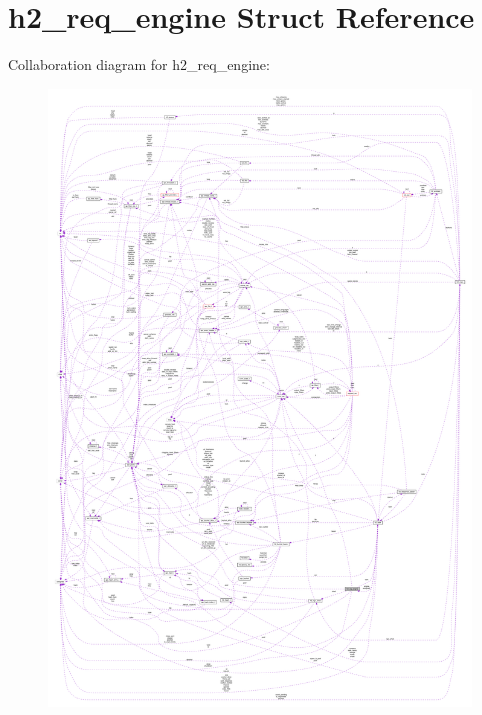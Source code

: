 \hypertarget{structh2__req__engine}{}\section{h2\+\_\+req\+\_\+engine Struct Reference}
\label{structh2__req__engine}


Collaboration diagram for h2\+\_\+req\+\_\+engine\+:
\nopagebreak
\begin{figure}[H]
\begin{center}
\leavevmode
\includegraphics[width=350pt]{structh2__req__engine__coll__graph}
\end{center}
\end{figure}
